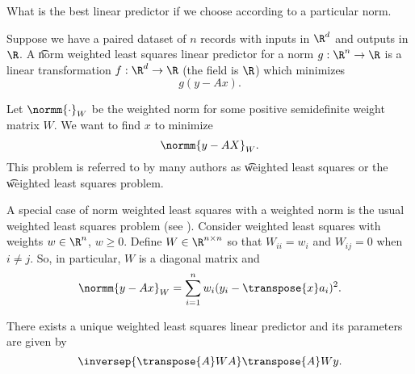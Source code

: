 

What is the best linear predictor if we choose according to a particular norm.


Suppose we have a paired dataset of $n$ records with inputs in $\R^d$ and outputs in $\R$.
A \t{norm weighted least squares linear predictor} for a norm $g: \R^n \to \R$ is a linear transformation $f: \R^d \to \R$ (the field is $\R$) which minimizes
\[
  g(y - Ax).
\]


Let $\normm{\cdot}_{W}$ be the weighted norm for some positive semidefinite weight matrix $W$.
We want to find $x$ to minimize
\[
  \normm{y - AX}_{W}.
\]
This problem is referred to by many authors as \t{weighted least squares} or the \t{weighted least squares problem}.



A special case of norm weighted least squares with a weighted norm is the usual weighted least squares problem (see ).
Consider weighted least squares with weights $w \in \R^n$, $w \geq 0$.
Define $W \in \R^{n \times n}$ so that $W_{ii} = w_i$ and $W_{ij} = 0$ when $i \neq j$.
So, in particular, $W$ is a diagonal matrix and
\[
  \normm{y - Ax}_{W} = \sum_{i = 1}^{n} w_i(y_i  - \transpose{x}a_i)^2.
\]


\begin{proposition}
There exists a unique weighted least squares linear predictor and its parameters are given by
\[
  \inversep{\transpose{A}WA}\transpose{A}Wy.
\]
\end{proposition}
